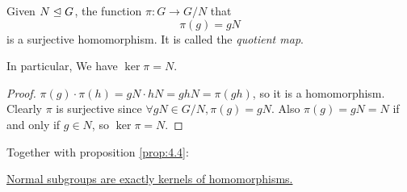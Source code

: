 \documentclass[a4paper]{article}
\begin{document}
    \begin{theorem}\label{thm:map from group to quotients}
        Given $ N\trianglelefteq G $, the function $ \pi:G\to G/N $ that 
        \[
            \pi(g)=gN
        \]
        is a surjective homomorphism. It is called the \textit{quotient map}. 
        
        In particular, We have $ \ker \pi=N $.
    \end{theorem}
    \begin{proof}
        $ \pi(g)\cdot \pi(h)=gN\cdot hN=ghN=\pi(gh) $, so it is a homomorphism. Clearly $ \pi $ is surjective since $ \forall gN\in G/N, \pi(g)=gN $. Also $ \pi(g)=gN=N $ if and only if $g\in N$, so $ \ker \pi=N $.
    \end{proof}
    Together with proposition \ref{prop:4.4}:
    
    \underline{Normal subgroups are exactly kernels of homomorphisms.}
\end{document}
